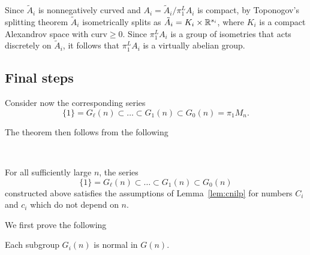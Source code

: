 \documentclass{amsart}
\begin{document}
Since $\tilde A_i$ is nonnegatively curved
and $A_i=\tilde A_i/\pi_1^LA_i$ is compact,
by Toponogov's splitting theorem
$\tilde A_i$ isometrically splits
as $\tilde A_i=K_i\times {\Bbb R}^{s_i}$,
where $K_i$ is a compact Alexandrov space with curv$\ge 0$.
Since $\pi_1^LA_i$ is a group of isometries
that acts %
discretely on $\tilde A_i$,
it follows that $\pi_1^LA_i$ is a virtually abelian group.

\subsection{Final steps}

Consider now the corresponding series
$$\{1\}=G_\ell(n)\subset\ldots\subset G_1(n)\subset G_0(n)=\pi_1M_n.$$

The theorem then follows from the following

\

\begin{lem}\label{l:claim}
For all sufficiently large $n$, the series
$$\{1\}=G_\ell(n)\subset\ldots\subset G_1(n)\subset G_0(n)$$
constructed above
satisfies the assumptions of Lemma~\ref{lem:cnilp}
for numbers $C_i$ and $c_i$ which do not depend on $n$.
\end{lem}

We first prove the following
\begin{slem}\label{lem:normal}
 Each subgroup $G_i(n)$ is normal in $G(n)$.
\end{slem}
\end{document}
